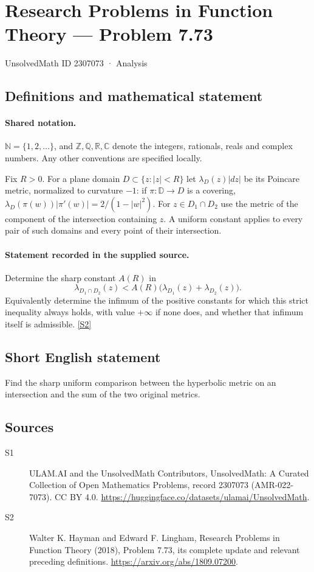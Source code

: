 \documentclass[11pt]{article}
\newcommand{\sref}[2]{\hyperlink{source:#1:#2}{[S#2]}}
\begin{document}
\setcounter{section}{2307072}
\section{Research Problems in Function Theory — Problem 7.73}\label{2307073}
{\small\sffamily UnsolvedMath ID 2307073 · Analysis}
\subsection{Definitions and mathematical statement}

\paragraph{Shared notation.}$\mathbb N=\{1,2,\ldots\}$, and $\mathbb Z,\mathbb Q,\mathbb R,\mathbb C$ denote the integers, rationals, reals and complex numbers. Any other conventions are specified locally.


Fix $R>0$. For a plane domain $D\subset\{z:|z|<R\}$ let $\lambda_D(z)|dz|$ be its Poincare metric, normalized to curvature $-1$: if $\pi:\mathbb D\to D$ is a covering, $\lambda_D(\pi(w))|\pi'(w)|=2/(1-|w|^2)$. For $z\in D_1\cap D_2$ use the metric of the component of the intersection containing $z$. A uniform constant applies to every pair of such domains and every point of their intersection.
\paragraph{Statement recorded in the supplied source.}
Determine the sharp constant $A(R)$ in
\[\lambda_{D_1\cap D_2}(z)<A(R)
\big(\lambda_{D_1}(z)+\lambda_{D_2}(z)\big).
\]
Equivalently determine the infimum of the positive constants for which this strict inequality always holds, with value $+\infty$ if none does, and whether that infimum itself is admissible. \sref{2307073}{2}
\subsection{Short English statement}
Find the sharp uniform comparison between the hyperbolic metric on an intersection and the sum of the two original metrics.
\subsection{Sources}
\begin{description}
\item[\hypertarget{source:2307073:1}{S1}] ULAM.AI and the UnsolvedMath Contributors, UnsolvedMath: A Curated Collection of Open Mathematics Problems, record 2307073 (AMR-022-7073). CC BY 4.0. \url{https://huggingface.co/datasets/ulamai/UnsolvedMath}.
\item[\hypertarget{source:2307073:2}{S2}] Walter K. Hayman and Edward F. Lingham, Research Problems in Function Theory (2018), Problem 7.73, its complete update and relevant preceding definitions. \url{https://arxiv.org/abs/1809.07200}.
\end{description}
\label{end:2307073}
\end{document}
